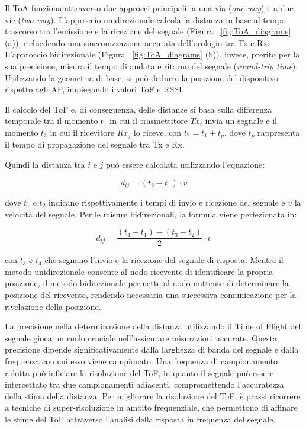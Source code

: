 Il ToA funziona attraverso due approcci principali: a una via (\textit{one way}) e a due vie (\textit{two way}). L'approccio unidirezionale calcola la distanza in base al tempo trascorso tra l'emissione e la ricezione del segnale (Figura ~\ref{fig:ToA_diagrams} (a)), richiedendo una sincronizzazione accurata dell'orologio tra Tx e Rx. L'approccio bidirezionale (Figura ~\ref{fig:ToA_diagrams} (b)), invece, prerito per la sua precisione, misura il tempo di andata e ritorno del segnale (\textit{round-trip time}). Utilizzando la geometria di base, si può dedurre la posizione del dispositivo rispetto agli AP, impiegando i valori ToF e RSSI.

Il calcolo del ToF e, di conseguenza, delle distanze si basa sulla differenza temporale tra il momento \( t_1 \) in cui il trasmettitore \( Tx_i \) invia un segnale e il momento \( t_2 \) in cui il ricevitore \( Rx_j \) lo riceve, con \( t_2 = t_1 + t_p \), dove \( t_p \) rappresenta il tempo di propagazione del segnale tra Tx e Rx. 

\pagebreak

\noindent Quindi la distanza tra $i$ e $j$ può essere calcolata utilizzando l'equazione: 

\begin{equation}
    d_{ij} = (t_2 - t_1) \cdot v
\end{equation}

\noindent dove $t_1$ e $t_2$ indicano rispettivamente i tempi di invio e ricezione del segnale e $v$ la velocità del segnale. Per le misure bidirezionali, la formula viene perfezionata in:

\begin{equation}
    d_{ij} = \frac{(t_4 - t_1) - (t_3 - t_2)}{2} \cdot v
\end{equation}

\noindent con $t_3$ e $t_4$ che segnano l'invio e la ricezione del segnale di risposta. Mentre il metodo unidirezionale consente al nodo ricevente di identificare la propria posizione, il metodo bidirezionale permette al nodo mittente di determinare la posizione del ricevente, rendendo necessaria una successiva comunicazione per la rivelazione della posizione.

La precisione nella determinazione della distanza utilizzando il Time of Flight del segnale gioca un ruolo cruciale nell'assicurare misurazioni accurate. Questa precisione dipende significativamente dalla larghezza di banda del segnale e dalla frequenza con cui esso viene campionato. Una frequenza di campionamento ridotta può inficiare la risoluzione del ToF, in quanto il segnale può essere intercettato tra due campionamenti adiacenti, compromettendo l'accuratezza della stima della distanza. Per migliorare la risoluzione del ToF, è prassi ricorrere a tecniche di super-risoluzione in ambito frequenziale, che permettono di affinare le stime del ToF attraverso l'analisi della risposta in frequenza del segnale.

